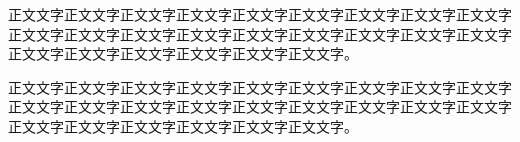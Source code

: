 

\begin{acknowledgement}
正文文字正文文字正文文字正文文字正文文字正文文字正文文字正文文字正文文字正文文字正文文字正文文字正文文字正文文字正文文字正文文字正文文字正文文字正文文字正文文字正文文字正文文字正文文字正文文字。

正文文字正文文字正文文字正文文字正文文字正文文字正文文字正文文字正文文字正文文字正文文字正文文字正文文字正文文字正文文字正文文字正文文字正文文字正文文字正文文字正文文字正文文字正文文字正文文字。
\end{acknowledgement}
